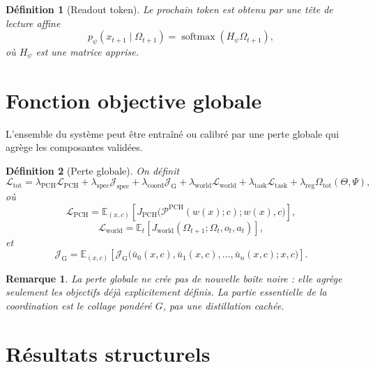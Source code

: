 \documentclass[11pt,a4paper]{article}
\newtheorem{definition}{Définition}[section]
\newtheorem{remark}{Remarque}[section]
\DeclareMathOperator{\softmax}{softmax}
\newcommand{\Pcal}{\mathcal P}
\newcommand{\1}{\mathbf 1}
\begin{document}
\begin{definition}[Readout token]
Le prochain token est obtenu par une tête de lecture affine
\[
p_\psi(x_{t+1}\mid \Omega_{t+1})
=
\softmax(H_\psi \Omega_{t+1}),
\]
où \(H_\psi\) est une matrice apprise.
\end{definition}

\section{Fonction objective globale}

L'ensemble du système peut être entraîné ou calibré par une perte globale qui agrège les composantes validées.

\begin{definition}[Perte globale]
On définit
\[
\mathcal L_{\mathrm{tot}}
=
\lambda_{\mathrm{PCH}}\mathcal L_{\mathrm{PCH}}
+
\lambda_{\mathrm{spec}}\mathcal J_{\mathrm{spec}}
+
\lambda_{\mathrm{coord}}\mathcal J_{\mathrm{G}}
+
\lambda_{\mathrm{world}}\mathcal L_{\mathrm{world}}
+
\lambda_{\mathrm{task}}\mathcal L_{\mathrm{task}}
+
\lambda_{\mathrm{reg}}\Omega_{\mathrm{tot}}(\Theta,\Psi),
\]
où
\[
\mathcal L_{\mathrm{PCH}}
=
\mathbb E_{(x,c)}\!\left[
J_{\mathrm{PCH}}\bigl(\Pcal^{\mathrm{PCH}}(w(x);c);w(x),c\bigr)
\right],
\]
\[
\mathcal L_{\mathrm{world}}
=
\mathbb E_{t}\!\left[
J_{\mathrm{world}}(\Omega_{t+1};\Omega_t,o_t,a_t)
\right],
\]
et
\[
\mathcal J_{\mathrm{G}}
=
\mathbb E_{(x,c)}\!\left[
\mathcal J_{\mathrm{G}}\bigl(\bar u_0(x,c),\bar u_1(x,c),\dots,\bar u_n(x,c);x,c\bigr)
\right].
\]
\end{definition}

\begin{remark}
La perte globale ne crée pas de nouvelle boîte noire : elle agrège seulement les objectifs déjà explicitement définis.  
La partie essentielle de la coordination est le collage pondéré \(G\), pas une distillation cachée.
\end{remark}

\section{Résultats structurels}
\end{document}
